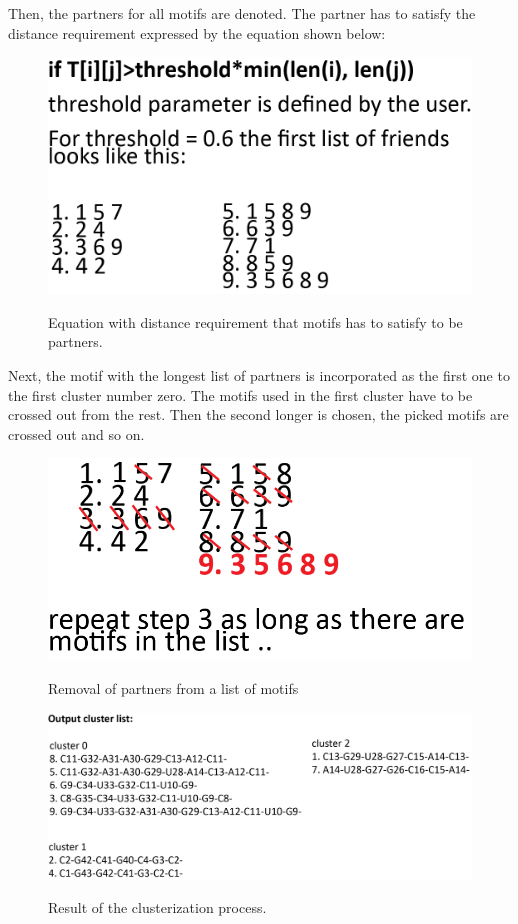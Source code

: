 \documentclass[12pt]{article}
\begin{document}
\newpage
Then, the partners for all motifs are denoted. The partner has to satisfy the distance requirement expressed by the equation shown below:
\begin{figure}[h!]
\centering
\includegraphics[scale=1]{./pictures/cluster_motif_step3.png}
\label{MotifsClusteringStep3}
\caption{Equation with distance requirement that motifs has to satisfy to be partners.}
\end{figure}

Next, the motif with the longest list of partners is incorporated as the first one to the first cluster number zero. The motifs used in the first cluster have to be crossed out from the rest. Then the second longer is chosen, the picked motifs are crossed out and so on.  

\begin{figure}[h!]
\centering
\includegraphics[scale=1]{./pictures/cluster_motif_step4.png}
\label{MotifsClusteringStep4}
\caption{Removal of partners from a list of motifs}
\end{figure}

\begin{figure}[h!]
\centering
\includegraphics[scale=1]{./pictures/cluster_motif_step5.png}
\label{MotifsClusteringStep5}
\caption{Result of the clusterization process.}
\end{figure}
\end{document}
